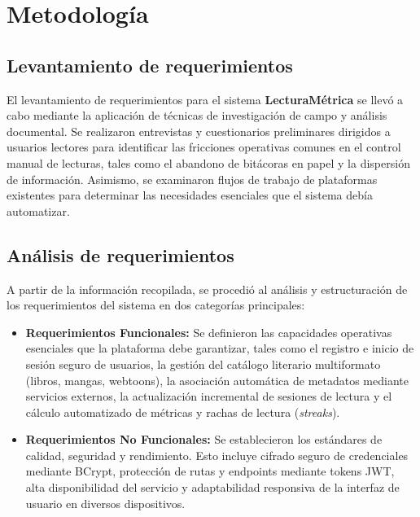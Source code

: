 \documentclass[12pt, atypical, journal]{article}
\begin{document}
\section{Metodología}

\subsection{Levantamiento de requerimientos}
El levantamiento de requerimientos para el sistema \textbf{LecturaMétrica} se llevó a cabo mediante la aplicación de técnicas de investigación de campo y análisis documental. Se realizaron entrevistas y cuestionarios preliminares dirigidos a usuarios lectores para identificar las fricciones operativas comunes en el control manual de lecturas, tales como el abandono de bitácoras en papel y la dispersión de información. Asimismo, se examinaron flujos de trabajo de plataformas existentes para determinar las necesidades esenciales que el sistema debía automatizar.

\subsection{Análisis de requerimientos}
A partir de la información recopilada, se procedió al análisis y estructuración de los requerimientos del sistema en dos categorías principales:
\begin{itemize}
    \item \textbf{Requerimientos Funcionales:} Se definieron las capacidades operativas esenciales que la plataforma debe garantizar, tales como el registro e inicio de sesión seguro de usuarios, la gestión del catálogo literario multiformato (libros, mangas, webtoons), la asociación automática de metadatos mediante servicios externos, la actualización incremental de sesiones de lectura y el cálculo automatizado de métricas y rachas de lectura (\textit{streaks}).
    \item \textbf{Requerimientos No Funcionales:} Se establecieron los estándares de calidad, seguridad y rendimiento. Esto incluye cifrado seguro de credenciales mediante BCrypt, protección de rutas y endpoints mediante tokens JWT, alta disponibilidad del servicio y adaptabilidad responsiva de la interfaz de usuario en diversos dispositivos.
\end{itemize}
\end{document}
